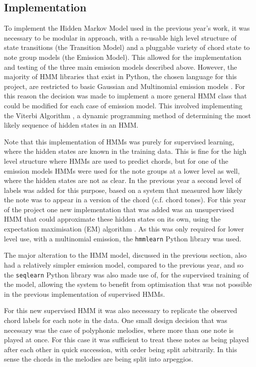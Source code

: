 \documentclass[bsc,singlespacing,logo, parskip, deptreport]{infthesis}
\begin{document}
\subsection{Implementation} \label{HMM IMP}

To implement the Hidden Markov Model used in the previous year's work, it was necessary to be modular in approach, with a re-usable high level structure of state transitions (the Transition Model) and a pluggable variety of chord state to note group models (the Emission Model). This allowed for the implementation and testing of the three main emission models described above. However, the majority of HMM libraries that exist in Python, the chosen language for this project, are restricted to basic Gaussian and Multinomial emission models \cite{lebedev_2015} \cite{buitinck}. For this reason the decision was made to implement a more general HMM class that could be modified for each case of emission model. This involved implementing the Viterbi Algorithm \cite{forney1973viterbi}, a dynamic programming method of determining the most likely sequence of hidden states in an HMM.

Note that this implementation of HMMs was purely for supervised learning, where the hidden states are known in the training data. This is fine for the high level structure where HMMs are used to predict chords, but for one of the emission models HMMs were used for the note groups at a lower level as well, where the hidden states are not as clear. In the previous year a second level of labels was added for this purpose, based on a system that measured how likely the note was to appear in a version of the chord (c.f. chord tones). For this year of the project one new implementation that was added was an unsupervised HMM that could approximate these hidden states on its own, using the expectation maximisation (EM) algorithm \cite{moon1996expectation}. As this was only required for lower level use, with a multinomial emission, the {\tt hmmlearn} \cite{lebedev_2015} Python library was used.

The major alteration to the HMM model, discussed in the previous section, also had a relatively simpler emission model, compared to the previous year, and so the {\tt seqlearn} Python library \cite{buitinck} was also made use of, for the supervised training of the model, allowing the system to benefit from optimisation that was not possible in the previous implementation of supervised HMMs.

For this new supervised HMM it was also necessary to replicate the observed chord labels for each note in the data. One small design decision that was necessary was the case of polyphonic melodies, where more than one note is played at once. For this case it was sufficient to treat these notes as being played after each other in quick succession, with order being split arbitrarily. In this sense the chords in the melodies are being split into arpeggios.
\end{document}
